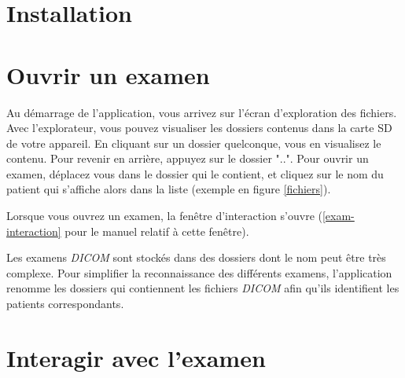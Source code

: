\section{Installation}

\section{Ouvrir un examen}

Au démarrage de l'application, vous arrivez sur l'écran d'exploration des fichiers. Avec l'explorateur, vous pouvez visualiser les dossiers contenus dans la carte SD de votre appareil. En cliquant sur un dossier quelconque, vous en visualisez le contenu. Pour revenir en arrière, appuyez sur le dossier "..". Pour ouvrir un examen, déplacez vous dans le dossier qui le contient, et cliquez sur le nom du patient qui s'affiche alors dans la liste (exemple en figure \vref{fichiers}).

Lorsque vous ouvrez un examen, la fenêtre d'interaction s'ouvre (\vref{exam-interaction} pour le manuel relatif à cette fenêtre).

\begin{note} %
Les examens \emph{DICOM} sont stockés dans des dossiers dont le nom peut être très complexe. Pour simplifier la reconnaissance des différents examens, l'application renomme les dossiers qui contiennent les fichiers \emph{DICOM} afin qu'ils identifient les patients correspondants.
\end{note}

\section{Interagir avec l'examen} \label{exam-interaction}